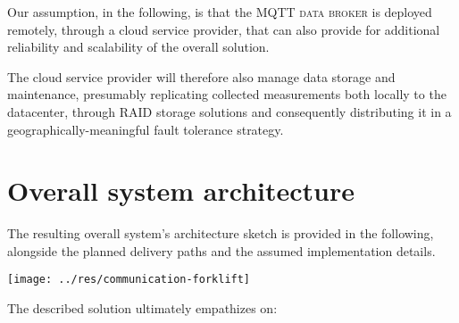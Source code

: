 \documentclass[a4paper,11pt]{article} %
\begin{document}
\smallskip

Our assumption, in the following, is that the \textsc{MQTT data broker} is deployed remotely, through a cloud service provider, that can also provide for additional reliability and scalability of the overall solution.

\medskip

The cloud service provider will therefore also manage data storage and maintenance, presumably replicating collected measurements both locally to the datacenter, through \textsc{RAID} storage solutions and consequently distributing it in a geographically-meaningful fault tolerance strategy.

\section{Overall system architecture}

The resulting overall system's architecture sketch is provided in the following, alongside the planned delivery paths and the assumed implementation details.

\begin{center}
    \texttt{[image: ../res/communication-forklift]}
\end{center}

The described solution ultimately empathizes on:
\end{document}
